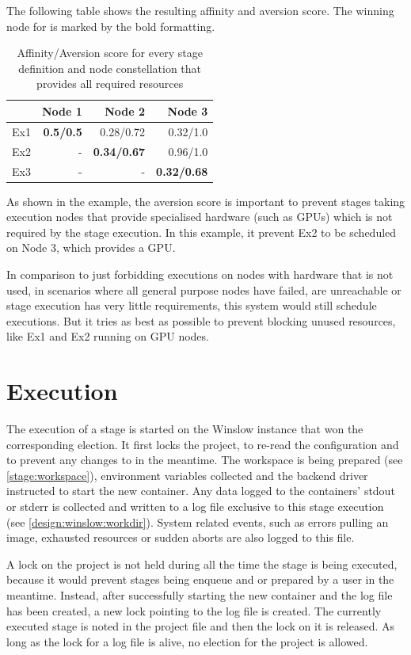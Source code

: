 The following table shows the resulting affinity and aversion score.
The winning node for is marked by the bold formatting.


\begin{table}[H]
	\centering
	\begin{tabular}{l|r|r|r}
		& Node 1 & Node 2 & Node 3 \\
		\hline
		Ex1 & \textbf{0.5/0.5}	& 		  0.28/0.72	& 		  0.32/1.0 \\
		Ex2 & - 				& \textbf{0.34/0.67}& 		  0.96/1.0 \\
		Ex3 & - 				& - 				& \textbf{0.32/0.68} \\
	\end{tabular}
	\caption{Affinity/Aversion score for every stage definition and node constellation that provides all required resources}
\end{table}

As shown in the example, the aversion score is important to prevent stages taking execution nodes that provide specialised hardware (such as GPUs) which is not required by the stage execution.
In this example, it prevent Ex2 to be scheduled on Node 3, which provides a GPU.

In comparison to just forbidding executions on nodes with hardware that is not used, in scenarios where all general purpose nodes have failed, are unreachable or stage execution has very little requirements, this system would still schedule executions.
But it tries as best as possible to prevent blocking unused resources, like Ex1 and Ex2 running on GPU nodes.

\section{Execution}

The execution of a stage is started on the Winslow instance that won the corresponding election.
It first locks the project, to re-read the configuration and to prevent any changes to in the meantime.
The workspace is being prepared (see \autoref{stage:workspace}), environment variables collected and the backend driver instructed to start the new container.
Any data logged to the containers' stdout or stderr is collected and written to a log file exclusive to this stage execution (see \autoref{design:winslow:workdir}).
System related events, such as errors pulling an image, exhausted resources or sudden aborts are also logged to this file.

A lock on the project is not held during all the time the stage is being executed, because it would prevent stages being enqueue and or prepared by a user in the meantime.
Instead, after successfully starting the new container and the log file has been created, a new lock pointing to the log file is created.
The currently executed stage is noted in the project file and then the lock on it is released.
As long as the lock for a log file is alive, no election for the project is allowed.

